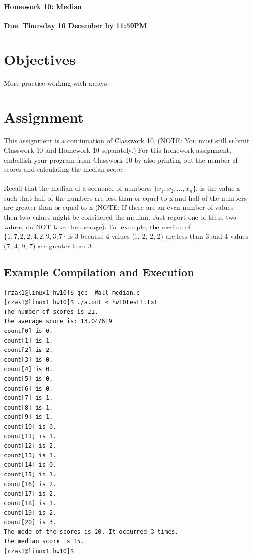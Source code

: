 \documentclass[letter,11pt]{article}
\begin{document}
\huge
\textbf{Homework 10: Median}
\normalsize
\\ ~~ \\
\textbf{Due: Thursday 16 December by 11:59PM}

\section*{Objectives}
\paragraph{}More practice working with arrays.

\section*{Assignment}
\paragraph{}This assignment is a continuation of Classwork 10. (NOTE: You must still submit Classwork 10 and Homework 10 separately.) For this homework assignment, embellish your program from Classwork 10 by also printing out the number of scores and calculating the median score.

\paragraph{}Recall that the median of a sequence of numbers, $\{x_1, x_2, \ldots, x_n\}$, is the value x such that half of the numbers are less than or equal to x and half of the numbers are greater than or equal to x (NOTE: If there are an even number of values, then two values might be considered the median. Just report one of these two values, do NOT take the average). For example, the median of $\{1, 7, 2, 2, 4, 2, 9, 3, 7\}$ is 3 because 4 values (1, 2, 2, 2) are less than 3 and 4 values (7, 4, 9, 7) are greater than 3.

\subsection*{Example Compilation and Execution}
\begin{verbatim}
[rzak1@linux1 hw10]$ gcc -Wall median.c
[rzak1@linux1 hw10]$ ./a.out < hw10test1.txt
The number of scores is 21.
The average score is: 13.047619
count[0] is 0.
count[1] is 1.
count[2] is 2.
count[3] is 0.
count[4] is 0.
count[5] is 0.
count[6] is 0.
count[7] is 1.
count[8] is 1.
count[9] is 1.
count[10] is 0.
count[11] is 1.
count[12] is 2.
count[13] is 1.
count[14] is 0.
count[15] is 1.
count[16] is 2.
count[17] is 2.
count[18] is 1.
count[19] is 2.
count[20] is 3.
The mode of the scores is 20. It occurred 3 times.
The median score is 15.
[rzak1@linux1 hw10]$
\end{verbatim}
\end{document}
